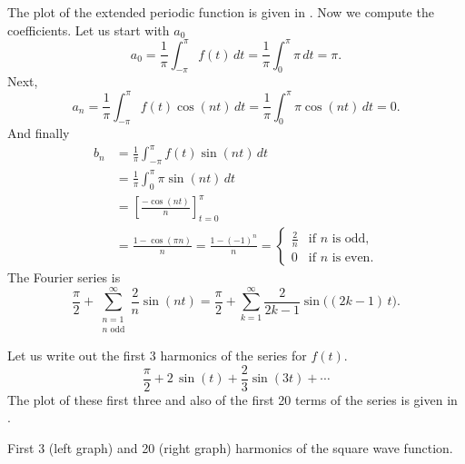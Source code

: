 \begin{example}
The plot of the extended periodic function is given in
.
Now we compute the coefficients.  Let us start with $a_0$
\begin{equation*}
a_0 = \frac{1}{\pi} \int_{-\pi}^\pi f(t) \,dt
= \frac{1}{\pi} \int_{0}^\pi \pi \,dt = \pi .
\end{equation*}
Next,
\begin{equation*}
a_n = \frac{1}{\pi} \int_{-\pi}^\pi f(t) \cos (nt) \,dt 
= \frac{1}{\pi} \int_{0}^\pi \pi \cos (nt) \,dt = 0 .
\end{equation*}
And finally
\begin{equation*}
\begin{split}
b_n & = \frac{1}{\pi} \int_{-\pi}^\pi f(t) \sin (nt) \,dt \\
& = \frac{1}{\pi} \int_{0}^\pi \pi \sin (nt) \,dt \\
& = \left[ \frac{- \cos (nt)}{n} \right]_{t=0}^\pi \\
& = \frac{1 - \cos (\pi n)}{n}
= \frac{1 - {(-1)}^n}{n}
=
\begin{cases}
\frac{2}{n} & \text{if } n \text{ is odd} , \\
0 & \text{if } n \text{ is even} .
\end{cases}
\end{split}
\end{equation*}
The Fourier series is
\begin{equation*}
\frac{\pi}{2} +  \sum_{\substack{n=1\\n \text{ odd}}}^\infty
\frac{2}{n} 
\sin (n t)
=
\frac{\pi}{2} + \sum_{k=1}^\infty
\frac{2}{2k-1} 
\sin \bigl( (2k-1)\, t \bigr) .
\end{equation*}

Let us write out the first 3 harmonics of the series for $f(t)$.
\begin{equation*}
\frac{\pi}{2}
+
2 \, \sin (t)
+
\frac{2}{3}  \sin (3t)
+ \cdots
\end{equation*}
The plot of these first three and also of the first 20 terms of the series
is given in
.

\begin{myfig}
\capstart
\caption{First 3 (left graph) and 20 (right graph) harmonics of the
square wave function.\label{ts:squarewavefsfig}}
\end{myfig}
\end{example}

